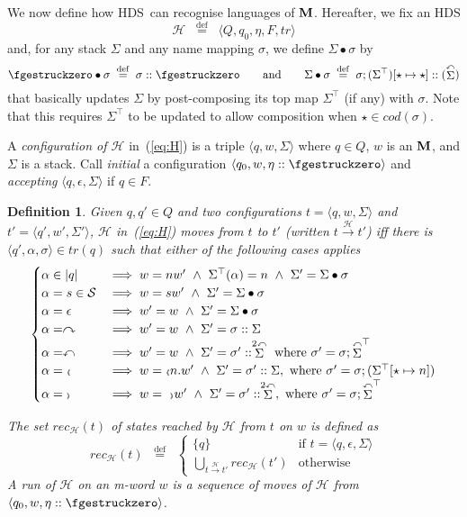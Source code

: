 \documentclass[runningheads,a4paper]{llncs}
\newcommand{\oscope}{\mbox{\tiny$\langle\!\!\langle$}}
\newcommand{\cscope}{\mbox{\tiny$\rangle\!\!\rangle$}}
\newcommand{\alp}{\mathcal S}
\newcommand{\stk}{\Sigma}
\newcommand{\pushtr}{\curvearrowright}
\newcommand{\poptr}{\curvearrowleft}
\newcommand{\popstk}[1]{\stackrel{\poptr}{#1}}
\newcommand{\popstktwo}[1]{\stackrel{2\poptr}{#1}}
\newcommand{\topstk}[1]{{#1}^\top}
\newcommand{\stkupd}[2]{{#1} \bullet {#2}}
\newcommand{\estk}{\fgestruckzero}
\newcommand{\step}[3]{#2 \stackrel{#1}{\to} #3}
\newcommand{\trans}{\mathit{tr}}
\newcommand{\rec}{\mathit{rec}}
\newcommand{\emptystr}{\epsilon}
\newcommand{\fresh}{\star}
\newcommand{\weight}[1]{|#1|}
\newcommand{\comp}[2]{#1 ; #2}
\newcommand{\comp}[2]{#2 \circ #1}
\newcommand{\mmdef}{\mbox{$\;\;\stackrel{\mathrm{def}}{=}\;\;$}}
\newcommand{\upd}[2]{[{#1} \mapsto {#2}]}
\newcommand{\hds}{HDS}
\newcommand{\hdns}{HDS}
\newcommand{\conf}[1]{\langle {#1} \rangle}
\newtheorem{definition}{Theorem}[section]
\newtheorem{definition}{Definition}[section]
\newcommand{\cod}[1]{\mathit{cod}(#1)}
\newcommand{\tuple}[1]{\langle#1\rangle}
\newcommand{\hdtr}[3]{\tuple{#2,#1,#3}}
\begin{document}
We now define how \hds\ can recognise languages of $\mathbf{M}$.
Hereafter, we fix an \hdns
\begin{equation}\label{eq:H}
  \mathcal H \mmdef \tuple{Q,q_0,\eta,F,\trans}
\end{equation}
and, for any stack $\stk$ and any name mapping $\sigma$, we define
$\stkupd \stk \sigma$ by
\[
\stkupd \estk \sigma \mmdef  \sigma :: \estk
\qquad \text{and} \qquad
\stkupd \stk \sigma \mmdef
  \comp \sigma {(\topstk \stk)\upd \fresh \fresh} :: (\popstk \stk)
\]
that basically updates $\stk$ by post-composing its top map $\topstk
\stk$ (if any) with $\sigma$.
Note that this requires $\topstk \stk$ to be updated to allow
composition when $\fresh \in \cod \sigma$.

A \emph{configuration of $\mathcal H$} in~(\ref{eq:H}) is a triple
$\tuple{q,w,\stk}$ where $q \in Q$, $w$ is an $\mathbf{M}$, and $\stk$ is
a stack.
Call \emph{initial} a configuration $\tuple{q_0,w,\eta::\estk}$ and
\emph{accepting} $\tuple{q, \emptystr, \stk}$ if $q \in F$.
\begin{definition}\label{def:hdstep}
  Given $q,q' \in Q$ and two configurations $t = \tuple{q, w, \stk}$
  and $t' = \tuple{q',w', \stk'}$, $\mathcal H$ in~(\ref{eq:H})
  \emph{moves from $t$ to $t'$} (written $\step{\mathcal H}{t}{t'}$)
  iff there is $\hdtr \alpha {q'} \sigma \in \trans(q)$ such that
  either of the following cases applies
  \[\begin{cases}
    \alpha \in \weight q
    & \implies
    w = nw' \ \land \
    \topstk \stk(\alpha) = n \ \land \
    \stk' = \stkupd \stk \sigma
    \\
    \alpha = s \in \alp
    & \implies
    w = sw' \ \land \
    \stk' = \stkupd \stk \sigma
    \\
    \alpha = \emptystr
    & \implies
    w' = w \ \land \ 
    \stk' = \stkupd \stk \sigma
    \\
    \alpha = \pushtr
    & \implies
    w' = w \ \land \
    \stk' = \sigma :: \stk
    \\
    \alpha = \poptr
    & \implies
    w' = w \ \land \
    \stk' = \sigma' :: \popstktwo \stk \text{ where }
    \sigma' = \comp{\sigma}{\topstk{\popstk \stk}}
    \\
    \alpha = \oscope
    & \implies
    w = \oscope n. w'\ \land \
    \stk' = \sigma' :: \stk, \text{ where }
    \sigma' = \comp{\sigma}{(\topstk \stk \upd \fresh n)}
    \\
    \alpha = \cscope
    & \implies
    w = \ \cscope w' \ \land \
    \stk' = \sigma' :: \popstktwo \stk, \text{ where }
    \sigma' = \comp{\sigma}{\topstk{\popstk \stk}}
  \end{cases}
  \]

  The set $\rec_{\mathcal H}(t)$ of states reached by $\mathcal H$
  from $t$ on $w$ is defined as
  \[
  \rec_{\mathcal H}(t) \mmdef
  \begin{cases}
    \{q\}
    & \text{if } t = \conf{q, \emptystr, \stk}
    \\
    \bigcup_{\step{\mathcal H}{t}{t'}}{\rec_{\mathcal H}(t')}
    & \text{otherwise}
  \end{cases}
  \]
  A \emph{run of $\mathcal H$ on an m-word $w$} is a sequence of moves
  of $\mathcal H$ from $\tuple{q_0, w, \eta::\estk}$.
\end{definition}
\end{document}
